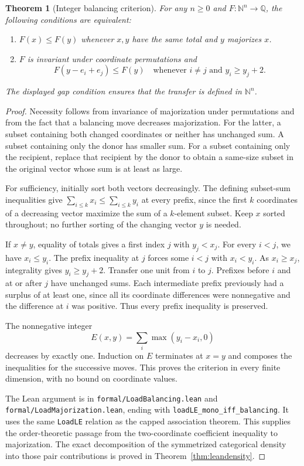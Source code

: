 \documentclass[11pt]{article}
\newtheorem{theorem}{Theorem}
\begin{document}
\begin{theorem}[Integer balancing criterion]\label{thm:leanbalancing}
For any $n\geq0$ and $F:\mathbb N^n\to\mathbb Q$, the following
conditions are equivalent:
\begin{enumerate}
 \item $F(x)\leq F(y)$ whenever $x,y$ have the same total and
 $y$ majorizes $x$.
 \item $F$ is invariant under coordinate permutations and
 \[
 F(y-e_i+e_j)\leq F(y)
 \quad\text{whenever }i\ne j\text{ and }y_i\geq y_j+2.
 \]
\end{enumerate}
The displayed gap condition ensures that the transfer is defined
in $\mathbb N^n$.
\end{theorem}
\begin{proof}
Necessity follows from invariance of majorization under permutations
and from the fact that a balancing move decreases majorization.
For the latter, a subset containing both changed coordinates or neither
has unchanged sum. A subset containing only the donor has smaller sum.
For a subset containing only the recipient, replace that recipient by
the donor to obtain a same-size subset in the original vector whose
sum is at least as large.

For sufficiency, initially sort both vectors decreasingly. The defining
subset-sum inequalities give
$\sum_{i\leq k}x_i\leq\sum_{i\leq k}y_i$ at every prefix, since
the first $k$ coordinates of a decreasing vector maximize the sum of
a $k$-element subset. Keep $x$ sorted throughout; no further sorting of
the changing vector $y$ is needed.

If $x\ne y$, equality of totals gives a first index $j$ with $y_j<x_j$.
For every $i<j$, we have $x_i\leq y_i$. The prefix inequality at $j$
forces some $i<j$ with $x_i<y_i$. As $x_i\geq x_j$, integrality gives
$y_i\geq y_j+2$. Transfer one unit from $i$ to $j$.
Prefixes before $i$ and at or after $j$ have unchanged sums. Each
intermediate prefix previously had a surplus of at least one, since
all its coordinate differences were nonnegative and the difference at
$i$ was positive. Thus every prefix inequality is preserved.

The nonnegative integer
\[
 E(x,y)=\sum_i\max(y_i-x_i,0)
\]
decreases by exactly one. Induction on $E$ terminates at $x=y$ and
composes the inequalities for the successive moves. This proves the
criterion in every finite dimension, with no bound on coordinate values.

The Lean argument is in \texttt{formal/LoadBalancing.lean} and
\texttt{formal/LoadMajorization.lean}, ending with
\texttt{loadLE\_mono\_iff\_balancing}. It uses the same
\texttt{LoadLE} relation as the capped association theorem.
This supplies the order-theoretic passage from the two-coordinate
coefficient inequality to majorization. The exact decomposition of
the symmetrized categorical density into those pair contributions
is proved in Theorem~\ref{thm:leandensity}.
\end{proof}
\end{document}
